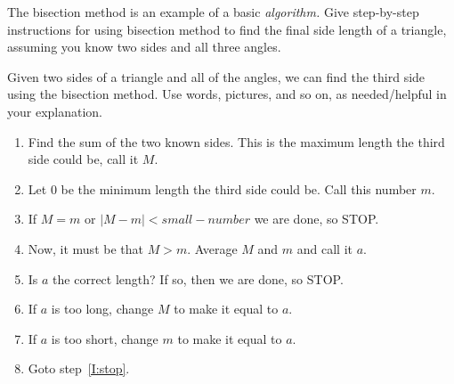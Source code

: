 \documentclass{ximera}
\begin{document}
\begin{question}
  The bisection method is an example of a basic \textit{algorithm.}
  Give step-by-step instructions for using bisection method to find
  the final side length of a triangle, assuming you know two sides and
  all three angles.
  \begin{freeResponse}
    Given two sides of a triangle and all of the angles, we can find
    the third side using the bisection method.  Use words, pictures,
    and so on, as needed/helpful in your explanation.

    \begin{enumerate}
      \item Find the sum of the two known sides. This is the maximum
        length the third side could be, call it $M$.
      \item Let $0$ be the minimum length the third side could be. Call this number $m$.
      \item\label{I:stop} If $M=m$ or $|M-m|< small-number$ we are done, so STOP.
      \item Now, it must be that $M>m$. Average $M$ and $m$ and call it $a$.
      \item Is $a$ the correct length? If so, then we are done, so STOP.
      \item If $a$ is too long, change $M$ to make it equal to $a$.
      \item If $a$ is too short, change $m$ to make it equal to $a$.
      \item Goto step~\ref{I:stop}.
    \end{enumerate}
  \end{freeResponse}
\end{question}
\end{document}
